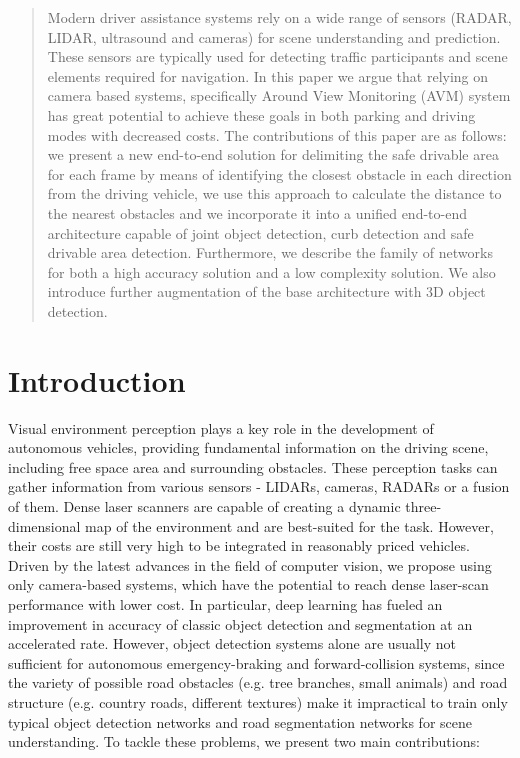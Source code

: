 \documentclass[10pt,twocolumn,letterpaper]{article}
\begin{document}
\begin{abstract}
   Modern driver assistance systems rely on a wide range of sensors (RADAR, LIDAR, ultrasound and cameras) for scene understanding and prediction. These sensors are typically used for detecting traffic participants and scene elements required for navigation. In this paper we argue that relying on camera based systems, specifically Around View Monitoring (AVM) system has great potential to achieve these goals in both parking and driving modes with decreased costs. The contributions of this paper are as follows: we present a new end-to-end solution for delimiting the safe drivable area for each frame by means of identifying the closest obstacle in each direction from the driving vehicle, we use this approach to calculate the distance to the nearest obstacles and we incorporate it into a unified end-to-end architecture capable of joint object detection, curb detection and safe drivable area detection. Furthermore, we describe the family of networks for both a high accuracy solution and a low complexity solution. We also introduce further augmentation of the base architecture with 3D object detection.
\end{abstract}

\section{Introduction}

Visual environment perception plays a key role in the development of autonomous vehicles, providing fundamental information on the driving scene, including free space area and surrounding obstacles. These perception tasks can gather information from various sensors - LIDARs, cameras, RADARs or a fusion of them. Dense laser scanners are capable of creating a dynamic three-dimensional map of the environment and are best-suited for the task. However, their costs are still very high to be integrated in reasonably priced vehicles. Driven by the latest advances in the field of computer vision, we propose using only camera-based systems, which have the potential to reach dense laser-scan performance with lower cost. In particular, deep learning has fueled an improvement in accuracy of classic object detection and segmentation at an accelerated rate. However, object detection systems alone are usually not sufficient for autonomous emergency-braking and forward-collision systems, since the variety of possible road obstacles (e.g. tree branches, small animals) and road structure (e.g. country roads, different textures) make it impractical to train only typical object detection networks and road segmentation networks for scene understanding.  To tackle these problems, we present two main contributions:
\end{document}
